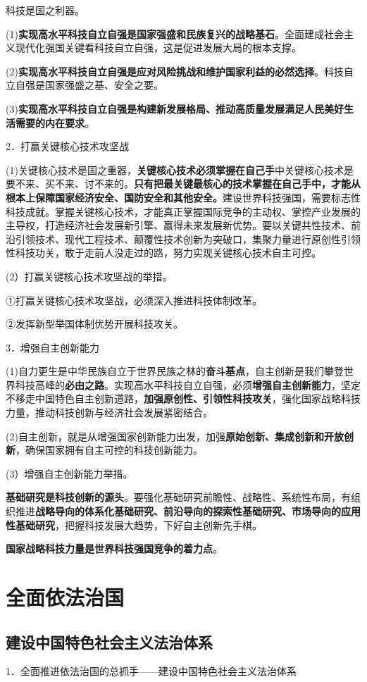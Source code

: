 \documentclass[lang=cn,10pt]{elegantbook}
\begin{document}
	科技是国之利器。
	
	(1)\textbf{实现高水平科技自立自强是国家强盛和民族复兴的战略基石}。全面建成社会主义现代化强国关键看科技自立自强，这是促进发展大局的根本支撑。
	
	(2)\textbf{实现高水平科技自立自强是应对风险挑战和维护国家利益的必然选择}。科技自立自强是国家强盛之基、安全之要。
	
	(3)\textbf{实现高水平科技自立自强是构建新发展格局、推动高质量发展满足人民美好生活需要的内在要求}。
	
	2．打赢关键核心技术攻坚战
	
	(1)关键核心技术是国之重器，\textbf{关键核心技术必须掌握在自己手}中关键核心技术是要不来、买不来、讨不来的。\textbf{只有把最关键最核心的技术掌握在自己手中，才能从根本上保障国家经济安全、国防安全和其他安全。}建设世界科技强国，需要标志性科技成就。掌握关键核心技术，才能真正掌握国际竞争的主动权、掌控产业发展的主导权，打造经济社会发展新引擎、赢得未来发展新优势。要以关键共性技术、前沿引领技术、现代工程技术、颠覆性技术创新为突破口，集聚力量进行原创性引领性科技功关，敢于走前人没走过的路，努力实现关键核心技术自主可控。
	
	(2）打赢关键核心技术攻坚战的举措。
	
	①打赢关键核心技术攻坚战，必须深入推进科技体制改革。
	
	②发挥新型举国体制优势开展科技攻关。
	
	3．增强自主创新能力
	
	(1)自力更生是中华民族自立于世界民族之林的\textbf{奋斗基点}，自主创新是我们攀登世界科技高峰的\textbf{必由之路}。实现高水平科技自立自强，必须\textbf{增强自主创新能力}，坚定不移走中国特色自主创新道路，\textbf{加强原创性、引领性科技攻关}，强化国家战略科技力量，推动科技创新与经济社会发展紧密结合。
	
	(2)自主创新，就是从增强国家创新能力出发，加强\textbf{原始创新、集成创新和开放创新}，确保国家拥有自主可控的科技创新能力。
	
	(3）增强自主创新能力举措。
	
	\textbf{基础研究是科技创新的源头}。要强化基础研究前瞻性、战略性、系统性布局，有组织推进\textbf{战略导向的体系化基础研究、前沿导向的探索性基础研究、市场导向的应用性基础研究}，把握科技发展大趋势，下好自主创新先手棋。
	
	\textbf{国家战略科技力量是世界科技强国竞争的着力点}。
	
	\chapter{全面依法治国}
	\section{建设中国特色社会主义法治体系}
	1．全面推进依法治国的总抓手——建设中国特色社会主义法治体系
	
\end{document}
